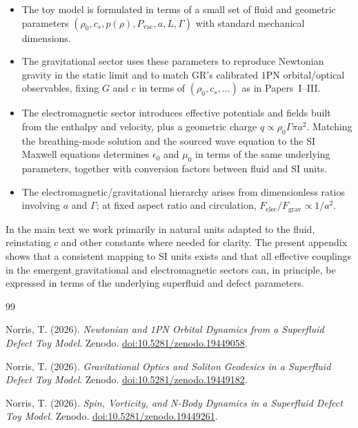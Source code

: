 \documentclass[11pt]{article}
\begin{document}
\begin{itemize}
  \item The toy model is formulated in terms of a small set of fluid and geometric parameters $(\rho_0,c_s,p(\rho),P_{\mathrm{vac}},a,L,\Gamma)$ with standard mechanical dimensions.

  \item The gravitational sector uses these parameters to reproduce Newtonian gravity in the static limit and to match GR's calibrated $1$PN orbital/optical observables, fixing $G$ and $c$ in terms of $(\rho_0,c_s,\dots)$ as in Papers~I--III.

  \item The electromagnetic sector introduces effective potentials and fields built from the enthalpy and velocity, plus a geometric charge $q \propto \rho_0 \Gamma \pi a^2$.  Matching the breathing-mode solution and the sourced wave equation to the SI Maxwell equations determines $\epsilon_0$ and $\mu_0$ in terms of the same underlying parameters, together with conversion factors between fluid and SI units.

  \item The electromagnetic/gravitational hierarchy arises from dimensionless ratios involving $a$ and $\Gamma$; at fixed aspect ratio and circulation, $F_{\mathrm{elec}}/F_{\mathrm{grav}} \propto 1/a^2$.
\end{itemize}

In the main text we work primarily in natural units adapted to the fluid, reinstating $c$ and other constants where needed for clarity.  The present appendix shows that a consistent mapping to SI units exists and that all effective couplings in the emergent gravitational and electromagnetic sectors can, in principle, be expressed in terms of the underlying superfluid and defect parameters.


\begin{thebibliography}{99}

Norris, T. (2026).
\newblock \emph{Newtonian and 1PN Orbital Dynamics from a Superfluid Defect Toy Model}.
\newblock Zenodo.
\newblock \href{https://doi.org/10.5281/zenodo.19449058}{doi:10.5281/zenodo.19449058}.

Norris, T. (2026).
\newblock \emph{Gravitational Optics and Soliton Geodesics in a Superfluid Defect Toy Model}.
\newblock Zenodo.
\newblock \href{https://doi.org/10.5281/zenodo.19449182}{doi:10.5281/zenodo.19449182}.

Norris, T. (2026).
\newblock \emph{Spin, Vorticity, and N-Body Dynamics in a Superfluid Defect Toy Model}.
\newblock Zenodo.
\newblock \href{https://doi.org/10.5281/zenodo.19449261}{doi:10.5281/zenodo.19449261}.

\end{thebibliography}
\end{document}
